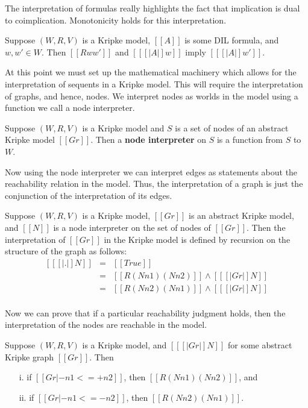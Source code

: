 \noindent
The interpretation of formulas really highlights the fact that implication is dual to coimplication.  Monotonicity
holds for this interpretation.

\begin{lemma}[Monotonicity]
  \label{lemma:monotonicity}
  Suppose $(W, R, V)$ is a Kripke model, $[[A]]$ is some DIL formula, and $w,w' \in W$.
  Then $[[R w w']]$ and $[[ [| A |] w]]$ imply $[[ [| A |] w']]$.
\end{lemma}

At this point we must set up the mathematical machinery which allows
for the interpretation of sequents in a Kripke model.  This will
require the interpretation of graphs, and hence, nodes.  We interpret
nodes as worlds in the model using a function we call a node
interpreter.
\begin{definition}
  \label{def:node_interpreter}
  Suppose $(W, R, V)$ is a Kripke model and $S$ is a set of nodes of
  an abstract Kripke model $[[Gr]]$.  Then a \textbf{node interpreter} on
  $S$ is a function from $S$ to $W$.
\end{definition}
Now using the node interpreter we can interpret edges as statements
about the reachability relation in the model.  Thus, the
interpretation of a graph is just the conjunction of the
interpretation of its edges.
\begin{definition}
  \label{def:graph_interp}
  Suppose $(W, R, V)$ is a Kripke model, $[[Gr]]$ is an abstract Kripke
  model, and $[[N]]$ is a node interpreter on the set of nodes of $[[Gr]]$.
  Then the interpretation of
  $[[Gr]]$ in the Kripke model is defined by recursion on the structure
  of the graph as follows:
  \[
  \begin{array}{lll}
    [[ [| . |] N ]]            & = & [[True]]\\
    [[ [| n1 <=+ n2, Gr |] N]] & = & [[R (N n1) (N n2)]] \land [[ [| Gr |] N]]\\
    [[ [| n1 <=- n2, Gr |] N]] & = & [[R (N n2) (N n1)]] \land [[ [| Gr |] N]]\\
  \end{array}
  \]
\end{definition}
Now we can prove that if a particular reachability judgment holds,
then the interpretation of the nodes are reachable in the model.
\begin{lemma}
  \label{lemma:reachability_interpretation}
  Suppose $(W, R, V)$ is a Kripke model, and $[[ [| Gr |] N]]$ for some abstract Kripke graph $[[Gr]]$. Then
  \begin{itemize}
  \item[i.] if $[[Gr |- n1 <=+ n2]]$, then $[[R (N n1) (N n2)]]$, and
  \item[ii.] if $[[Gr |- n1 <=- n2]]$, then $[[R (N n2) (N n1)]]$.
  \end{itemize}
\end{lemma}

